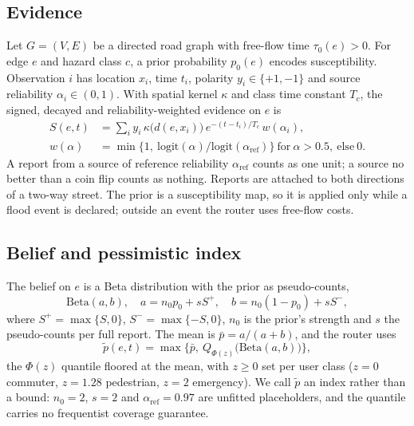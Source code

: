 \documentclass[conference]{IEEEtran}
\begin{document}
\subsection{Evidence}
Let $G=(V,E)$ be a directed road graph with free-flow time $\tau_0(e)>0$. For edge $e$ and hazard class $c$, a prior probability $p_0(e)$ encodes susceptibility. Observation $i$ has location $x_i$, time $t_i$, polarity $y_i\in\{+1,-1\}$ and source reliability $\alpha_i\in(0,1)$. With spatial kernel $\kappa$ and class time constant $T_c$, the signed, decayed and reliability-weighted evidence on $e$ is
\begin{align}
S(e,t) &= \textstyle\sum_i y_i\,\kappa\big(d(e,x_i)\big)\,e^{-(t-t_i)/T_c}\,w(\alpha_i), \label{eq:evidence}\\
w(\alpha) &= \min\big\{1,\ \mathrm{logit}(\alpha)/\mathrm{logit}(\alpha_{\mathrm{ref}})\big\}\ \text{for}\ \alpha>0.5,\ \text{else}\ 0. \nonumber
\end{align}
A report from a source of reference reliability $\alpha_{\mathrm{ref}}$ counts as one unit; a source no better than a coin flip counts as nothing. Reports are attached to both directions of a two-way street. The prior is a susceptibility map, so it is applied only while a flood event is declared; outside an event the router uses free-flow costs.

\subsection{Belief and pessimistic index}
The belief on $e$ is a Beta distribution with the prior as pseudo-counts,
\begin{equation}
\mathrm{Beta}(a,b),\quad a=n_0p_0+sS^+,\quad b=n_0(1-p_0)+sS^-, \label{eq:beta}
\end{equation}
where $S^+=\max\{S,0\}$, $S^-=\max\{-S,0\}$, $n_0$ is the prior's strength and $s$ the pseudo-counts per full report. The mean is $\bar p=a/(a+b)$, and the router uses
\begin{equation}
\tilde p(e,t)=\max\big\{\bar p,\ Q_{\Phi(z)}\big(\mathrm{Beta}(a,b)\big)\big\}, \label{eq:pess}
\end{equation}
the $\Phi(z)$ quantile floored at the mean, with $z\ge0$ set per user class ($z=0$ commuter, $z=1.28$ pedestrian, $z=2$ emergency). We call $\tilde p$ an index rather than a bound: $n_0=2$, $s=2$ and $\alpha_{\mathrm{ref}}=0.97$ are unfitted placeholders, and the quantile carries no frequentist coverage guarantee.
\end{document}
